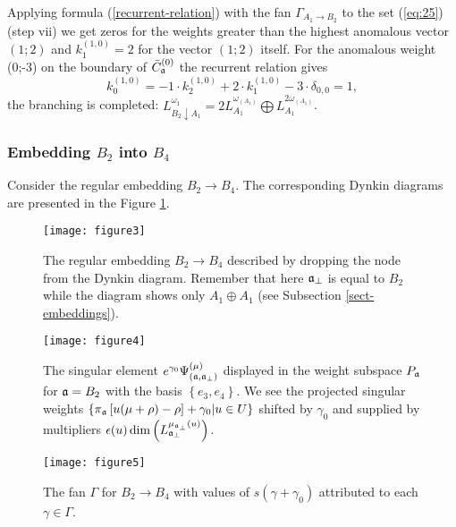Applying formula (\ref{recurrent-relation}) with the fan
$\Gamma_{A_1\to B_2}$ to the set (\ref{eq:25}) (step vii)
we get zeros for the weights
greater than the highest anomalous vector $(1;2)$
and $k^{(1,0)}_1=2$ for the vector $(1;2)$ itself.
For the anomalous weight (0;-3) on the boundary of $\bar{C}^{(0)}_{\mathfrak{a}}$ the recurrent relation gives
\begin{equation*}
  \label{eq:23}
  k^{(1,0)}_{0}=-1\cdot k^{(1,0)}_2 +2\cdot k^{(1,0)}_1 - 3\cdot \delta_{0,0} = 1,
\end{equation*}
the branching is completed: $L_{B_2\downarrow A_1}^{\omega_1}=
2L_{A_1}^{\omega_{\left(A_1\right)} }
\bigoplus
L_{A_1}^{2\omega_{\left(A_1\right)} }$.

\subsubsection{Embedding $B_2$ into $B_4$}
\label{sec:someth-high-dimens}
Consider the regular embedding $B_2 \rightarrow B_4$.
The corresponding Dynkin diagrams are presented in the Figure \ref{fig:dynkin}.
\begin{figure}[h]
  \centering
  \texttt{[image: figure3]}
  \caption{The regular embedding $B_2 \rightarrow B_4$ described by dropping the node from the Dynkin diagram.
  Remember that here $\mathfrak{a}_{\bot}$ is equal to $B_2$ while the diagram
  shows only $A_1\oplus A_1$ (see Subsection \ref{sect-embeddings}).}
  \label{fig:dynkin}
\end{figure}

\begin{figure}[pt]
  \centering
    \texttt{[image: figure4]}
  \caption{The singular element $e^{\gamma_0}\Psi ^{\left( \mu \right) }_{\left(  \mathfrak{a}, \mathfrak{a}_{\bot} \right)}$
  displayed in the weight subspace $P_{\mathfrak{a}}$ for $\mathfrak{a}=B_2$ with the basis $\left\{e_3,e_4\right\}$.
  We see the projected singular weights $\left\{\pi _{\mathfrak{a}}\left[ u(\mu +\rho )-\rho \right] +\gamma_0 | u \in U \right\}$
  shifted by $\gamma_0$ and supplied by multipliers
  $\epsilon(u)\dim\left(L_{\mathfrak{a}_{\perp }}^{\mu_{\mathfrak{a}_{\perp }}\left( u\right) }\right)$.}
  \label{fig:B4B2anom}

%
  \centering
  \texttt{[image: figure5]}
  \caption{The fan $\Gamma$ for $B_2\rightarrow B_4$ with values of $s(\gamma+\gamma_0)$ attributed to each $\gamma \in \Gamma$.}
  \label{fig:B4B2Fan}
\end{figure}

